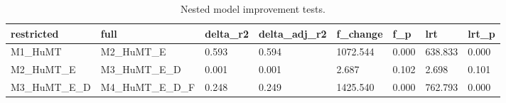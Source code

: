 \begin{table}[t]
\centering
\caption{Nested model improvement tests.}
\label{tab:nested_tests}
\begin{tabular}{llllllll}
\toprule
restricted & full & delta\_r2 & delta\_adj\_r2 & f\_change & f\_p & lrt & lrt\_p \\
\midrule
M1\_HuMT & M2\_HuMT\_E & 0.593 & 0.594 & 1072.544 & 0.000 & 638.833 & 0.000 \\
M2\_HuMT\_E & M3\_HuMT\_E\_D & 0.001 & 0.001 & 2.687 & 0.102 & 2.698 & 0.101 \\
M3\_HuMT\_E\_D & M4\_HuMT\_E\_D\_F & 0.248 & 0.249 & 1425.540 & 0.000 & 762.793 & 0.000 \\
\bottomrule
\end{tabular}
\end{table}
